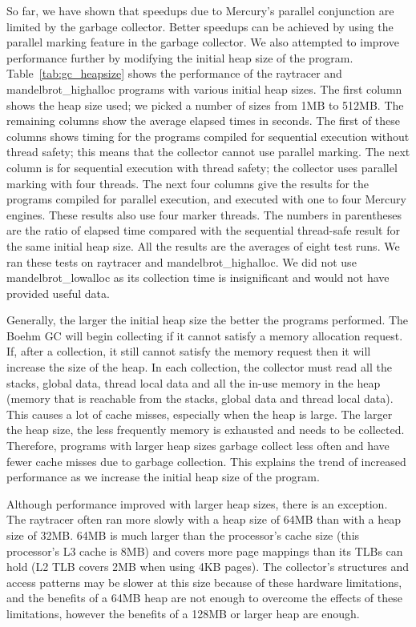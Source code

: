 So far,
we have shown that speedups due to Mercury's parallel conjunction
are limited by the garbage collector.
Better speedups can be achieved by using the parallel marking feature in the
garbage collector.
We also attempted to improve performance further by modifying the initial
heap size of the program.
Table~\ref{tab:gc_heapsize} shows the performance of the raytracer and
mandelbrot\_highalloc programs with various initial heap sizes.
The first column shows the heap size used;
we picked a number of sizes from 1MB to 512MB.
The remaining columns show the average elapsed times in seconds.
The first of these columns shows timing for the programs compiled for
sequential execution without thread safety;
this means that the collector cannot use parallel marking.
The next column is for sequential execution with thread safety;
the collector uses parallel marking with four threads.
The next four columns give the results for the programs compiled for
parallel execution, and executed with one to four Mercury engines.
These results also use four marker threads.
The numbers in parentheses are the ratio of elapsed time compared with the
sequential thread-safe result for the same initial heap size.
All the results are the averages of eight test runs.
We ran these tests on raytracer and mandelbrot\_highalloc.
We did not use mandelbrot\_lowalloc as its collection time is insignificant
and would not have provided useful data.

Generally, the larger the initial heap size the better the programs
performed.
The Boehm GC will begin collecting if it cannot satisfy a memory allocation
request.
If, after a collection, it still cannot satisfy the memory request then it
will increase the size of the heap.
In each collection,
the collector must read all the stacks, global data, thread local data and
all the in-use memory in the heap 
(memory that is reachable from the stacks, global data and thread local
data).
This causes a lot of cache misses, especially when the heap is large.
The larger the heap size,
the less frequently memory is exhausted and needs to be collected.
Therefore,
programs with larger heap sizes garbage collect less often and
have fewer cache misses due to garbage collection.
This explains the trend of increased performance as we increase the initial
heap size of the program.

Although performance improved with larger heap sizes,
there is an exception.
The raytracer often ran more slowly with a heap size of 64MB
than with a heap size of 32MB.
64MB is much larger than the processor's cache size
(this processor's L3 cache is 8MB) and
covers more page mappings than its TLBs can hold (L2 TLB covers 2MB when
using 4KB pages).
The collector's structures and access patterns may be slower at this size
because of these hardware limitations,
and the benefits of a 64MB heap are not enough to overcome the effects of
these limitations,
however the benefits of a 128MB or larger heap are enough.

